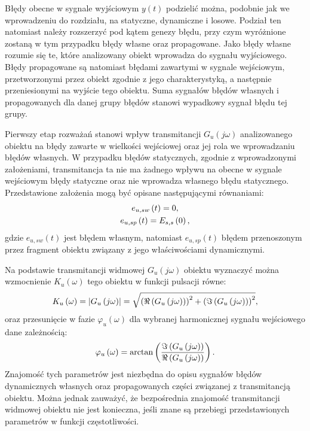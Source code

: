 Błędy obecne w sygnale wyjściowym $y(t)$ podzielić można, podobnie jak we wprowadzeniu do rozdziału, na statyczne, dynamiczne i losowe. Podział ten natomiast należy rozszerzyć pod kątem genezy błędu, przy czym wyróżnione zostaną w tym przypadku błędy własne oraz propagowane. Jako błędy własne rozumie się te, które analizowany obiekt wprowadza do sygnału wyjściowego. Błędy propagowane są natomiast błędami zawartymi w sygnale wejściowym, przetworzonymi przez obiekt zgodnie z jego charakterystyką, a następnie przeniesionymi na wyjście tego obiektu. Suma sygnałów błędów własnych i propagowanych dla danej grupy błędów stanowi wypadkowy sygnał błędu tej grupy.

Pierwszy etap rozważań stanowi wpływ transmitancji $G_{u}(j\omega)$ analizowanego obiektu na błędy zawarte w wielkości wejściowej oraz jej rola we wprowadzaniu błędów własnych. W przypadku błędów statycznych, zgodnie z wprowadzonymi założeniami, transmitancja ta nie ma żadnego wpływu na obecne w sygnale wejściowym błędy statyczne oraz nie wprowadza własnego błędu statycznego. Przedstawione założenia mogą być opisane następującymi równaniami:
\begin{gather}
e_{u,sw} \left(t\right) = 0 \label{eq:mid_cont_err_stat_self}, \\
e_{u,sp} \left(t\right) = E_{s,s} \left(0\right) \label{eq:mid_cont_err_stat_prop},
\end{gather}
gdzie $e_{u,sw}(t)$ jest błędem własnym, natomiast $e_{u,sp}(t)$ błędem przenoszonym przez fragment obiektu związany z jego właściwościami dynamicznymi.

Na podstawie transmitancji widmowej $G_{u}(j\omega)$ obiektu wyznaczyć można wzmocnienie $K_{u}(\omega)$ tego obiektu w funkcji pulsacji równe:
\begin{equation}
K_{u} \left(\omega\right) = \left| G_{u} \left(j\omega\right) \right| =
	\sqrt{\left( \Re \left( G_{u} \left(j\omega\right) \right) \right)^{2} +
	\left( \Im \left( G_{u} \left(j\omega\right) \right) \right)^{2}}
\label{eq:mid_cont_amp},
\end{equation}
oraz przesunięcie w fazie $\varphi_{u}(\omega)$ dla wybranej harmonicznej sygnału wejściowego dane zależnością:
\begin{equation}
\varphi_{u} \left(\omega\right) = \arctan \left( \frac{\Im \left( G_{u} \left(j\omega\right) \right)}{\Re \left( G_{u} \left(j\omega\right) \right)} \right) \label{eq:mid_cont_phi}.
\end{equation}
Znajomość tych parametrów jest niezbędna do opisu sygnałów błędów dynamicznych własnych oraz propagowanych części związanej z transmitancją obiektu. Można jednak zauważyć, że bezpośrednia znajomość transmitancji widmowej obiektu nie jest konieczna, jeśli znane są przebiegi przedstawionych parametrów w funkcji częstotliwości.

